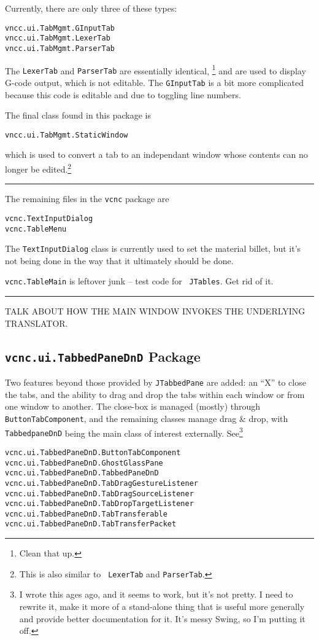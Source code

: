 \documentclass[titlepage,oneside,10pt]{article}
\newcommand\rulediv{\vskip 0mm\hfil\rule{0.4\textwidth}{0.4pt}\hfil\vskip 1mm}
\begin{document}
Currently, there are only three of these types:
\begin{verbatim}
vncc.ui.TabMgmt.GInputTab
vncc.ui.TabMgmt.LexerTab
vncc.ui.TabMgmt.ParserTab
\end{verbatim}
The {\tt LexerTab} and {\tt ParserTab} are essentially identical,
\footnote{Clean that up.} and are used to display G-code output, which
is not editable. The {\tt GInputTab} is a bit more complicated because
this code is editable and due to toggling line numbers.

The final class found in this package is 
\begin{verbatim}
vncc.ui.TabMgmt.StaticWindow
\end{verbatim}
which is used to convert a tab to an independant window whose contents
can no longer be edited.\footnote{This is also similar to {\tt
  LexerTab} and {\tt ParserTab}.}

\rulediv

The remaining files in the {\tt vcnc} package are 

\begin{verbatim}
vcnc.TextInputDialog
vcnc.TableMenu
\end{verbatim}
The {\tt TextInputDialog} class is currently used to set the material
billet, but it's not being done in the way that it ultimately should
be done.

{\tt vcnc.TableMain} is leftover junk -- test code for {\tt
  JTables}. Get rid of it.

\rulediv

TALK ABOUT HOW THE MAIN WINDOW INVOKES THE UNDERLYING TRANSLATOR.

\subsection{{\tt vcnc.ui.TabbedPaneDnD} Package}

Two features beyond those provided by {\tt JTabbedPane}
are added: an ``X'' to close the tabs, and the ability to drag and
drop the tabs within each window or from one window to another. The
close-box is managed (mostly) through {\tt ButtonTabComponent}, and
the remaining classes manage drag \& drop, with {\tt TabbedpaneDnD}
being the main class of interest externally. See\footnote{I wrote this
ages ago, and it seems to work, but it's not pretty. I need to rewrite
it, make it more of a stand-alone thing that is useful more generally
and provide better documentation for it. It's messy Swing, so I'm
putting it off. }
\begin{verbatim}
vcnc.ui.TabbedPaneDnD.ButtonTabComponent
vcnc.ui.TabbedPaneDnD.GhostGlassPane
vcnc.ui.TabbedPaneDnD.TabbedPaneDnD
vcnc.ui.TabbedPaneDnD.TabDragGestureListener
vcnc.ui.TabbedPaneDnD.TabDragSourceListener
vcnc.ui.TabbedPaneDnD.TabDropTargetListener
vcnc.ui.TabbedPaneDnD.TabTransferable
vcnc.ui.TabbedPaneDnD.TabTransferPacket
\end{verbatim}
\end{document}
